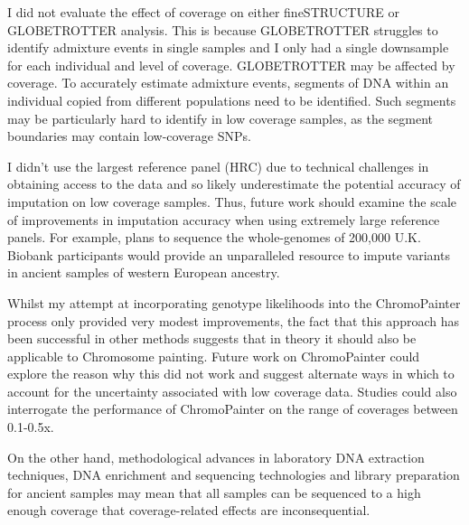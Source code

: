 I did not evaluate the effect of coverage on either fineSTRUCTURE or GLOBETROTTER analysis. This is because GLOBETROTTER struggles to identify admixture events in single samples and I only had a single downsample for each individual and level of coverage. GLOBETROTTER may be affected by coverage. To accurately estimate admixture events, segments of DNA within an individual copied from different populations need to be identified. Such segments may be particularly hard to identify in low coverage samples, as the segment boundaries may contain low-coverage SNPs.   

I didn't use the largest reference panel (HRC) due to technical challenges in obtaining access to the data and so likely underestimate the potential accuracy of imputation on low coverage samples. Thus, future work should examine the scale of improvements in imputation accuracy when using extremely large reference panels. For example, plans to sequence the whole-genomes of 200,000 U.K. Biobank participants would provide an unparalleled resource to impute variants in ancient samples of western European ancestry. 

Whilst my attempt at incorporating genotype likelihoods into the ChromoPainter process only provided very modest improvements, the fact that this approach has been successful in other methods \cite{ngsLD, vieira2016estimating, Meisner719, Lipatov023374} suggests that in theory it should also be applicable to Chromosome painting. Future work on ChromoPainter could explore the reason why this did not work and suggest alternate ways in which to account for the uncertainty associated with low coverage data. Studies could also interrogate the performance of ChromoPainter on the range of coverages between 0.1-0.5x. 

On the other hand, methodological advances in laboratory DNA extraction techniques, DNA enrichment and sequencing technologies and library preparation for ancient samples may mean that all samples can be sequenced to a high enough coverage that coverage-related effects are inconsequential. 



